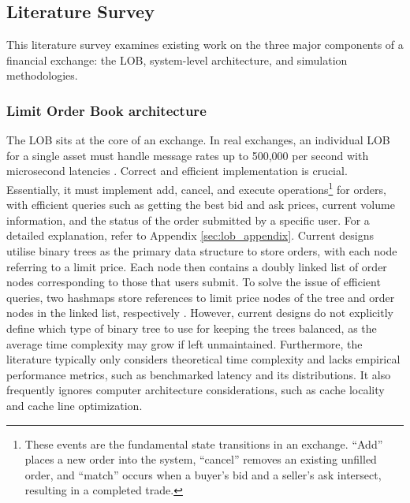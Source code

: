\documentclass[12pt,a4paper]{article}
\begin{document}
\subsection{Literature Survey}
This literature survey examines existing work on the three major components of a financial exchange: the LOB, system-level architecture, and simulation methodologies.

\subsubsection{Limit Order Book architecture}
The LOB sits at the core of an exchange. In real exchanges, an individual LOB for a single asset must handle message rates up to 500,000 per second with microsecond latencies \cite{ref4}. Correct and efficient implementation is crucial. Essentially, it must implement add, cancel, and execute operations\footnote{These events are the fundamental state transitions in an exchange. ``Add'' places a new order into the system, ``cancel'' removes an existing unfilled order, and ``match'' occurs when a buyer's bid and a seller's ask intersect, resulting in a completed trade.} for orders, with efficient queries such as getting the best bid and ask prices, current volume information, and the status of the order submitted by a specific user. For a detailed explanation, refer to Appendix \ref{sec:lob_appendix}. Current designs utilise binary trees as the primary data structure to store orders, with each node referring to a limit price. Each node then contains a doubly linked list of order nodes corresponding to those that users submit. To solve the issue of efficient queries, two hashmaps store references to limit price nodes of the tree and order nodes in the linked list, respectively \cite{ref6}. However, current designs do not explicitly define which type of binary tree to use for keeping the trees balanced, as the average time complexity may grow if left unmaintained. Furthermore, the literature typically only considers theoretical time complexity and lacks empirical performance metrics, such as benchmarked latency and its distributions. It also frequently ignores computer architecture considerations, such as cache locality and cache line optimization.
\end{document}

